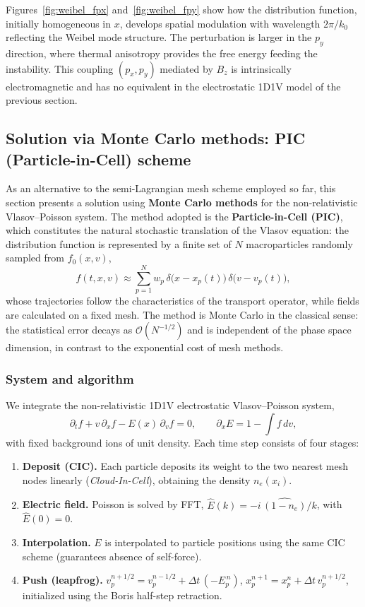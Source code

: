 \documentclass[11pt,a4paper,twoside,pdf]{article}
\numberwithin{equation}{section}
\begin{document}
Figures~\ref{fig:weibel_fpx} and~\ref{fig:weibel_fpy} show how the distribution function, initially homogeneous in $x$, develops spatial modulation with wavelength $2\pi/k_0$ reflecting the Weibel mode structure. The perturbation is larger in the $p_y$ direction, where thermal anisotropy provides the free energy feeding the instability. This coupling $(p_x,p_y)$ mediated by $B_z$ is intrinsically electromagnetic and has no equivalent in the electrostatic 1D1V model of the previous section.


\subsection{Solution via Monte Carlo methods: PIC (Particle-in-Cell) scheme}
\label{sec:pic}

As an alternative to the semi-Lagrangian mesh scheme employed so far, this section presents a solution using \textbf{Monte Carlo methods} for the non-relativistic Vlasov--Poisson system. The method adopted is the \textbf{Particle-in-Cell (PIC)}, which constitutes the natural stochastic translation of the Vlasov equation: the distribution function is represented by a finite set of $N$ macroparticles randomly sampled from $f_0(x,v)$,
\[
f(t,x,v)\approx \sum_{p=1}^{N} w_p\,\delta\!\big(x-x_p(t)\big)\,\delta\!\big(v-v_p(t)\big),
\]
whose trajectories follow the characteristics of the transport operator, while fields are calculated on a fixed mesh. The method is Monte Carlo in the classical sense: the statistical error decays as $\mathcal{O}(N^{-1/2})$ and is independent of the phase space dimension, in contrast to the exponential cost of mesh methods.

\subsubsection*{System and algorithm}

We integrate the non-relativistic 1D1V electrostatic Vlasov--Poisson system,
\[
\partial_t f + v\,\partial_x f - E(x)\,\partial_v f = 0,\qquad
\partial_x E = 1 - \int f\,dv,
\]
with fixed background ions of unit density. Each time step consists of four stages:

\begin{enumerate}
    \item \textbf{Deposit (CIC).} Each particle deposits its weight to the two nearest mesh nodes linearly (\emph{Cloud-In-Cell}), obtaining the density $n_e(x_i)$.
    \item \textbf{Electric field.} Poisson is solved by FFT, $\hat{E}(k) = -i\,\widehat{(1-n_e)}/k$, with $\hat{E}(0)=0$.
    \item \textbf{Interpolation.} $E$ is interpolated to particle positions using the same CIC scheme (guarantees absence of self-force).
    \item \textbf{Push (leapfrog).}
    $v_p^{n+1/2} = v_p^{n-1/2} + \Delta t\,(-E_p^{\,n})$,
    $x_p^{n+1} = x_p^{n} + \Delta t\, v_p^{n+1/2}$,
    initialized using the Boris half-step retraction.
\end{enumerate}
\end{document}
